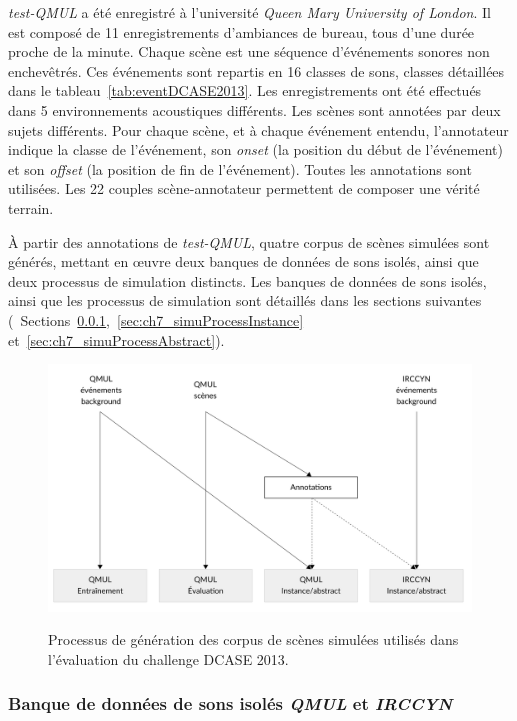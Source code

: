 \emph{test-QMUL} a été enregistré à l'université \emph{Queen Mary University of London}. Il est composé de 11 enregistrements d'ambiances de bureau, tous d'une durée proche de la minute. Chaque scène est une séquence d'événements sonores non enchevêtrés. Ces événements sont repartis en 16 classes de sons, classes détaillées dans le tableau~\ref{tab:eventDCASE2013}. Les enregistrements ont été effectués dans 5 environnements acoustiques différents. Les scènes sont annotées par deux sujets différents. Pour chaque scène, et à chaque événement entendu, l'annotateur indique la classe de l'événement, son \emph{onset} (la position du début de l'événement) et son \emph{offset} (la position de fin de l'événement). Toutes les annotations sont utilisées. Les 22 couples scène-annotateur permettent de composer une vérité terrain.

À partir des annotations de \emph{test-QMUL}, quatre corpus de scènes simulées sont générés, mettant en œuvre deux banques de données de sons isolés, ainsi que deux processus de simulation distincts. Les banques de données de sons isolés, ainsi que les processus de simulation sont détaillés dans les sections suivantes (\cf~Sections~\ref{sec:ch7_eventDataset},~\ref{sec:ch7_simuProcessInstance} et~\ref{sec:ch7_simuProcessAbstract}). 

\begin{figure}[t]
\begin{center}
\includegraphics[width=1\textwidth]{gfx/ch_7/databasesTasslp.pdf}
\label{fig:databasesDCASE2013Simu}
\caption{Processus de génération des corpus de scènes simulées utilisés dans l'évaluation du challenge DCASE 2013.} 
\end{center}
\end{figure}

\subsubsection{Banque de données de sons isolés \emph{QMUL} et \emph{IRCCYN}}
\label{sec:ch7_eventDataset}

